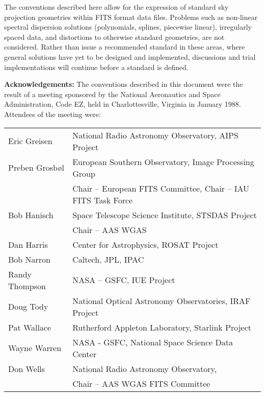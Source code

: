 The conventions described here allow for the expression of standard sky
projection geometries within FITS format data files.  Problems such as
non-linear spectral dispersion solutions (polynomials, splines, piecewise
linear), irregularly spaced data, and distortions to otherwise standard
geometries, are not considered.  Rather than issue a recommended standard in
these areas, where general solutions have yet to be designed and implemented,
discussions and trial implementations will continue before a standard is
defined. 

\vspace*{.2in}

{\bf Acknowledgements:}  The conventions described in this document were the
result of a meeting sponsored by the National Aeronautics and Space
Administration, Code EZ, held in Charlottesville, Virginia in January 1988.
Attendees of the meeting were:

\begin{tabular}{ll}
Eric Greisen & National Radio Astronomy Observatory, AIPS Project \\
Preben Grosb{\o}l & European Southern Observatory, Image Processing Group \\
 & Chair -- European FITS Committee, Chair -- IAU FITS Task Force \\
Bob Hanisch & Space Telescope Science Institute, STSDAS Project \\
 & Chair -- AAS WGAS \\
Dan Harris & Center for Astrophysics, ROSAT Project \\
Bob Narron & Caltech, JPL, IPAC \\
Randy Thompson & NASA -- GSFC, IUE Project \\
Doug Tody & National Optical Astronomy Observatories, IRAF Project \\
Pat Wallace & Rutherford Appleton Laboratory, Starlink Project \\
Wayne Warren & NASA - GSFC, National Space Science Data Center \\
Don Wells & National Radio Astronomy Observatory,\\
 & Chair -- AAS WGAS FITS Committee \\
\end{tabular}




